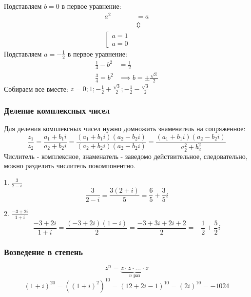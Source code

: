 \documentclass[12pt, a4paper]{article}
\begin{document}
\begin{exmp}
            Подставляем \( b = 0 \) в первое уравнение: 
            \begin{align*}
                a^2 & = a \\
                    & \Updownarrow \\
                \left[ \begin{array}{l}
                        a = 1\\
                        a = 0
                \end{array}\right.
            \end{align*}
            Подставляем \( a = -\frac{1}{2} \) в первое уравнение:
            \begin{align*}
                \frac{1}{4} - b^2 &= \frac{1}{2} \\
                \frac{3}{4} = b^2 &\implies b = \pm \frac{\sqrt{3} }{2} 
            \end{align*}
            Собираем все вместе: \( z = 0; 1; -\frac{1}{2} + \frac{\sqrt{3} }{2}; -\frac{1}{2} - \frac{\sqrt{3} }{2} \)
    \end{exmp}

    \subsubsection{Деление комплексных чисел}
    Для деления комплексных чисел нужно домножить знаменатель на сопряженное: \[
        \frac{z_{1}}{z_{2}} = \frac{a_{1} + b_{1}i}{a_{2} + b_{2}i} = \frac{(a_{1} + b_{1}i)(a_{2} - b_{2}i)}{(a_{2} + b_{2}i)(a_{2} - b_{2}i)} = \frac{(a_{1} + b_{1}i)(a_{2} - b_{2}i)}{a_{2}^2 + b_{2}^2} 
    \] 
    Числитель - комплексное, знаменатель - заведомо действительное, следовательно, можно разделить числитель покомпонентно.

    \begin{exmp}
    \item 1. \( \frac{3}{2 - i} \)
        \[
            \frac{3}{2 - i} = \frac{3(2 + i)}{5} = \frac{6}{5} + \frac{3}{5}i
        \] 
        
    \item 2. \( \frac{-3 + 2i}{1 + i} \)
        \[
            \frac{-3 + 2i}{1 + i} = \frac{(-3 + 2i)(1 - i)}{2} = \frac{-3 + 3i + 2i + 2}{2} = -\frac{1}{2} + \frac{5}{2}i
        \] 
    \end{exmp}

    \subsubsection{Возведение в степень}
    \[
        z^{n} = \underbrace{z \cdot z \cdot \ldots \cdot z }_{ n \text{ раз}}
    \] 
    \[
        (1 + i)^{20} = ((1 + i)^2)^{10} = (12 + 2i - 1)^{10} = (2i)^{10} = -1024 
    \] 
\end{document}
